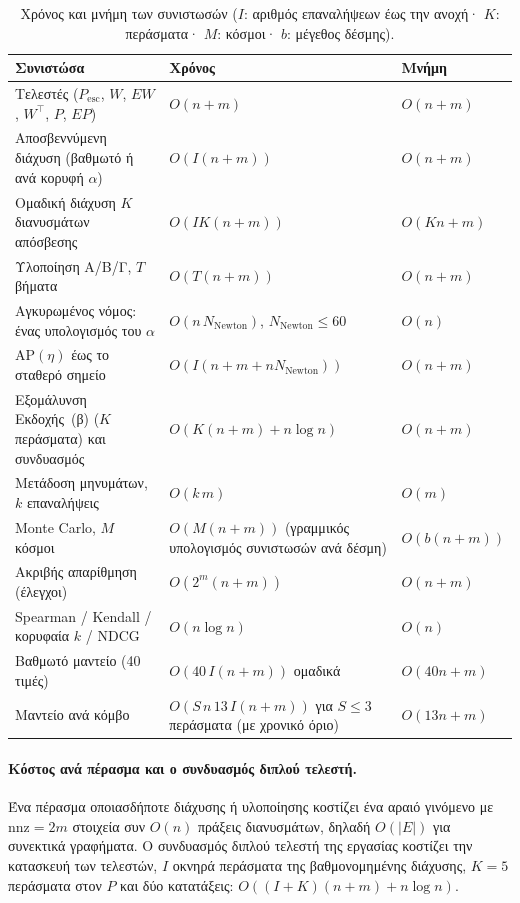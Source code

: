 \documentclass[11pt,a4paper]{article}
\theoremstyle{definition}
\theoremstyle{plain}
\newcommand{\Pesc}{P_{\mathrm{esc}}}
\newcommand{\AP}{\mathrm{AP}}
\begin{document}
\begin{table}[!ht]
\centering
\caption{Χρόνος και μνήμη των συνιστωσών ($I$: αριθμός επαναλήψεων έως την ανοχή· $K$: περάσματα· $M$: κόσμοι· $b$: μέγεθος δέσμης).}
\label{tab:complexity}
{\footnotesize
\begin{tabular}{>{\raggedright\arraybackslash}p{5.4cm}>{\raggedright\arraybackslash}p{5.2cm}>{\raggedright\arraybackslash}p{4.6cm}}
\toprule
Συνιστώσα & Χρόνος & Μνήμη \\
\midrule
Τελεστές ($\Pesc$, $W$, $EW$, $W^{\top}$, $P$, $EP$) & $O(n+m)$ & $O(n+m)$ \\
Αποσβεννύμενη διάχυση (βαθμωτό ή ανά κορυφή $\alpha$) & $O(I(n+m))$ & $O(n+m)$ \\
Ομαδική διάχυση $K$ διανυσμάτων απόσβεσης & $O(IK(n+m))$ & $O(Kn+m)$ \\
Υλοποίηση Α/Β/Γ, $T$ βήματα & $O(T(n+m))$ & $O(n+m)$ \\
Αγκυρωμένος νόμος: ένας υπολογισμός του $\alpha$ & $O(n\,N_{\mathrm{Newton}})$, $N_{\mathrm{Newton}}\le60$ & $O(n)$ \\
$\AP(\eta)$ έως το σταθερό σημείο & $O(I(n+m+n N_{\mathrm{Newton}}))$ & $O(n+m)$ \\
Εξομάλυνση Εκδοχής~(β) ($K$ περάσματα) και συνδυασμός & $O(K(n+m)+n\log n)$ & $O(n+m)$ \\
Μετάδοση μηνυμάτων, $k$ επαναλήψεις & $O(k\,m)$ & $O(m)$ \\
Monte Carlo, $M$ κόσμοι & $O(M(n+m))$ (γραμμικός υπολογισμός συνιστωσών ανά δέσμη) & $O(b(n+m))$ \\
Ακριβής απαρίθμηση (έλεγχοι) & $O(2^m(n+m))$ & $O(n+m)$ \\
Spearman / Kendall / κορυφαία $k$ / NDCG & $O(n\log n)$ & $O(n)$ \\
Βαθμωτό μαντείο (40 τιμές) & $O(40\,I(n+m))$ ομαδικά & $O(40n+m)$ \\
Μαντείο ανά κόμβο & $O(S\,n\,13\,I(n+m))$ για $S\le3$ περάσματα (με χρονικό όριο) & $O(13n+m)$ \\
\bottomrule
\end{tabular}}
\end{table}

\paragraph{Κόστος ανά πέρασμα και ο συνδυασμός διπλού τελεστή.} Ένα πέρασμα οποιασδήποτε διάχυσης ή υλοποίησης κοστίζει ένα αραιό γινόμενο με $\mathrm{nnz}=2m$ στοιχεία συν $O(n)$ πράξεις διανυσμάτων, δηλαδή $O(|E|)$ για συνεκτικά γραφήματα. Ο συνδυασμός διπλού τελεστή της εργασίας κοστίζει την κατασκευή των τελεστών, $I$ οκνηρά περάσματα της βαθμονομημένης διάχυσης, $K=5$ περάσματα στον $P$ και δύο κατατάξεις: $O((I+K)(n+m)+n\log n)$.
\end{document}
